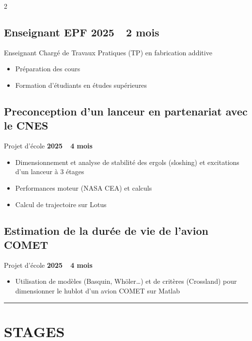 \documentclass[10pt,a4paper]{article}
\newcommand{\datetag}[1]{\hfill{\small\bfseries #1}}
\begin{document}
\begin{paracol}{2}
\begin{minipage}[t]{0.53\linewidth}
    \subsection{Enseignant EPF \datetag{2025\ \ 2 mois}}
    Enseignant Chargé de Travaux Pratiques (TP) en fabrication additive
    \begin{itemize}
        \item Préparation des cours
        \item Formation d'étudiants en études supérieures
    \end{itemize}
\end{minipage}\hfill
\begin{minipage}[t]{0.43\linewidth}
    \subsection{Preconception d'un lanceur en partenariat avec le CNES}
    Projet d'école \datetag{2025\ \ 4 mois}
    \begin{itemize}
        \item Dimensionnement et analyse de stabilité des ergols (sloshing)
              et excitations d'un lanceur à 3 étages
        \item Performances moteur (NASA CEA) et calculs
        \item Calcul de trajectoire sur Lotus
    \end{itemize}

    \subsection{Estimation de la durée de vie de l'avion COMET}
    Projet d'école \datetag{2025\ \ 4 mois}
    \begin{itemize}
        \item Utilisation de modèles (Basquin, Whöler\ldots) et de critères
              (Crossland) pour dimensionner le hublot d'un avion COMET
              sur Matlab
    \end{itemize}
\end{minipage}

\vspace{4pt}
\hrule
\vspace{4pt}

\section{STAGES}


\end{paracol}
\end{document}
